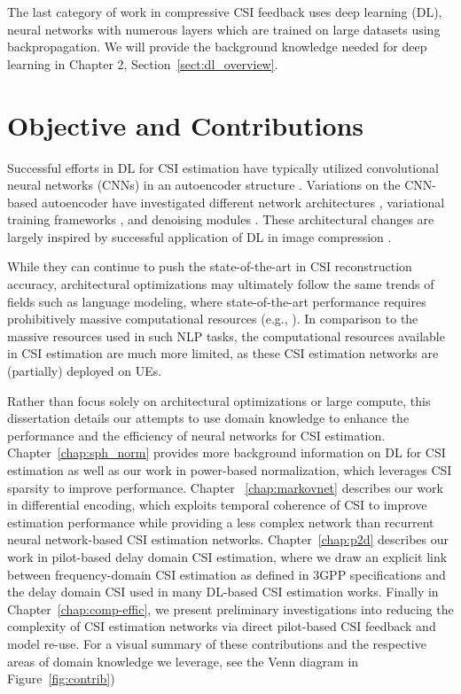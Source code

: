 The last category of work in compressive CSI feedback uses deep learning (DL), neural networks with numerous layers which are trained on large datasets using backpropagation. We will provide the background knowledge needed for deep learning in Chapter 2, Section~\ref{sect:dl_overview}.

\section{Objective and Contributions}

Successful efforts in DL for CSI estimation have typically utilized convolutional neural networks (CNNs) in an autoencoder structure \cite{ref:csinet}. Variations on the CNN-based autoencoder have investigated different network architectures \cite{ref:Lu2020CRNet}, variational training frameworks \cite{ref:Hussien2020PRVNet}, and denoising modules \cite{ref:Sun2020AnciNet}. These architectural changes are largely inspired by successful application of DL in image compression \cite{ref:szegedy2017inception,ref:balle2017end,ref:xie2012image}.

While they can continue to push the state-of-the-art in CSI reconstruction accuracy, architectural optimizations may ultimately follow the same trends of fields such as language modeling, where state-of-the-art performance requires prohibitively massive computational resources (e.g., \cite{ref:brown2020language}). In comparison to the massive resources used in such NLP tasks, the computational resources available in CSI estimation are much more limited, as these CSI estimation networks are (partially) deployed on UEs. 

Rather than focus solely on architectural optimizations or large compute, this dissertation details our attempts to use domain knowledge to enhance the performance and the efficiency of neural networks for CSI estimation. Chapter~\ref{chap:sph_norm} provides more background information on DL for CSI estimation as well as our work in power-based normalization, which leverages CSI sparsity to improve performance. Chapter ~\ref{chap:markovnet} describes our work in differential encoding, which exploits temporal coherence of CSI to improve estimation performance while providing a less complex network than recurrent neural network-based CSI estimation networks. Chapter~\ref{chap:p2d} describes our work in pilot-based delay domain CSI estimation, where we draw an explicit link between frequency-domain CSI estimation as defined in 3GPP specifications and the delay domain CSI used in many DL-based CSI estimation works. Finally in Chapter~\ref{chap:comp-effic}, we present preliminary investigations into reducing the complexity of CSI estimation networks via direct pilot-based CSI feedback and model re-use. For a visual summary of these contributions and the respective areas of domain knowledge we leverage, see the Venn diagram in Figure~\ref{fig:contrib})

